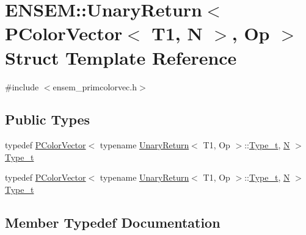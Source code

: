 \hypertarget{structENSEM_1_1UnaryReturn_3_01PColorVector_3_01T1_00_01N_01_4_00_01Op_01_4}{}\section{E\+N\+S\+EM\+:\+:Unary\+Return$<$ P\+Color\+Vector$<$ T1, N $>$, Op $>$ Struct Template Reference}
\label{structENSEM_1_1UnaryReturn_3_01PColorVector_3_01T1_00_01N_01_4_00_01Op_01_4}


{\ttfamily \#include $<$ensem\+\_\+primcolorvec.\+h$>$}

\subsection*{Public Types}
\begin{DoxyCompactItemize}
\item 
typedef \mbox{\hyperlink{classENSEM_1_1PColorVector}{P\+Color\+Vector}}$<$ typename \mbox{\hyperlink{structENSEM_1_1UnaryReturn}{Unary\+Return}}$<$ T1, Op $>$\+::\mbox{\hyperlink{structENSEM_1_1UnaryReturn_3_01PColorVector_3_01T1_00_01N_01_4_00_01Op_01_4_a6f37cb5e1ae5f22c02017b613c6b7e24}{Type\+\_\+t}}, \mbox{\hyperlink{operator__name__util_8cc_a7722c8ecbb62d99aee7ce68b1752f337}{N}} $>$ \mbox{\hyperlink{structENSEM_1_1UnaryReturn_3_01PColorVector_3_01T1_00_01N_01_4_00_01Op_01_4_a6f37cb5e1ae5f22c02017b613c6b7e24}{Type\+\_\+t}}
\item 
typedef \mbox{\hyperlink{classENSEM_1_1PColorVector}{P\+Color\+Vector}}$<$ typename \mbox{\hyperlink{structENSEM_1_1UnaryReturn}{Unary\+Return}}$<$ T1, Op $>$\+::\mbox{\hyperlink{structENSEM_1_1UnaryReturn_3_01PColorVector_3_01T1_00_01N_01_4_00_01Op_01_4_a6f37cb5e1ae5f22c02017b613c6b7e24}{Type\+\_\+t}}, \mbox{\hyperlink{operator__name__util_8cc_a7722c8ecbb62d99aee7ce68b1752f337}{N}} $>$ \mbox{\hyperlink{structENSEM_1_1UnaryReturn_3_01PColorVector_3_01T1_00_01N_01_4_00_01Op_01_4_a6f37cb5e1ae5f22c02017b613c6b7e24}{Type\+\_\+t}}
\end{DoxyCompactItemize}


\subsection{Member Typedef Documentation}
\mbox{\label{structENSEM_1_1UnaryReturn_3_01PColorVector_3_01T1_00_01N_01_4_00_01Op_01_4_a6f37cb5e1ae5f22c02017b613c6b7e24}} 

